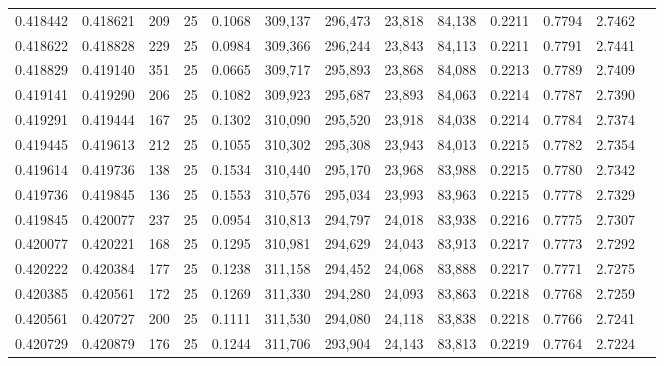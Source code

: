 \begin{tabular}{rrrrrrrrrrrrr}
0.418442 & 0.418621 &   209 &  25 &                                     0.1068 & 309,137 & 296,473 &  23,818 &  84,138 & 0.2211 & 0.7794 & 2.7462 \\
0.418622 & 0.418828 &   229 &  25 &                                     0.0984 & 309,366 & 296,244 &  23,843 &  84,113 & 0.2211 & 0.7791 & 2.7441 \\
0.418829 & 0.419140 &   351 &  25 &                                     0.0665 & 309,717 & 295,893 &  23,868 &  84,088 & 0.2213 & 0.7789 & 2.7409 \\
0.419141 & 0.419290 &   206 &  25 &                                     0.1082 & 309,923 & 295,687 &  23,893 &  84,063 & 0.2214 & 0.7787 & 2.7390 \\
0.419291 & 0.419444 &   167 &  25 &                                     0.1302 & 310,090 & 295,520 &  23,918 &  84,038 & 0.2214 & 0.7784 & 2.7374 \\
0.419445 & 0.419613 &   212 &  25 &                                     0.1055 & 310,302 & 295,308 &  23,943 &  84,013 & 0.2215 & 0.7782 & 2.7354 \\
0.419614 & 0.419736 &   138 &  25 &                                     0.1534 & 310,440 & 295,170 &  23,968 &  83,988 & 0.2215 & 0.7780 & 2.7342 \\
0.419736 & 0.419845 &   136 &  25 &                                     0.1553 & 310,576 & 295,034 &  23,993 &  83,963 & 0.2215 & 0.7778 & 2.7329 \\
0.419845 & 0.420077 &   237 &  25 &                                     0.0954 & 310,813 & 294,797 &  24,018 &  83,938 & 0.2216 & 0.7775 & 2.7307 \\
0.420077 & 0.420221 &   168 &  25 &                                     0.1295 & 310,981 & 294,629 &  24,043 &  83,913 & 0.2217 & 0.7773 & 2.7292 \\
0.420222 & 0.420384 &   177 &  25 &                                     0.1238 & 311,158 & 294,452 &  24,068 &  83,888 & 0.2217 & 0.7771 & 2.7275 \\
0.420385 & 0.420561 &   172 &  25 &                                     0.1269 & 311,330 & 294,280 &  24,093 &  83,863 & 0.2218 & 0.7768 & 2.7259 \\
0.420561 & 0.420727 &   200 &  25 &                                     0.1111 & 311,530 & 294,080 &  24,118 &  83,838 & 0.2218 & 0.7766 & 2.7241 \\
0.420729 & 0.420879 &   176 &  25 &                                     0.1244 & 311,706 & 293,904 &  24,143 &  83,813 & 0.2219 & 0.7764 & 2.7224 \\

\end{tabular}
